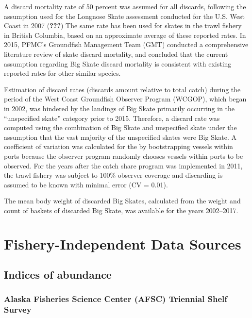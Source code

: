 \documentclass[12pt,]{article}
\begin{document}
A discard mortality rate of 50 percent was assumed for all discards,
following the assumption used for the Longnose Skate assessment
conducted for the U.S. West Coast in 2007 ({\textbf{???}}) The same rate
has been used for skates in the trawl fishery in British Columbia, based
on an approximate average of these reported rates. In 2015, PFMC's
Groundfish Management Team (GMT) conducted a comprehensive literature
review of skate discard mortality, and concluded that the current
assumption regarding Big Skate discard mortality is consistent with
existing reported rates for other similar species.

Estimation of discard rates (discards amount relative to total catch)
during the period of the West Coast Groundfish Observer Program (WCGOP),
which began in 2002, was hindered by the landings of Big Skate primarily
occurring in the ``unspecified skate'' category prior to 2015.
Therefore, a discard rate was computed using the combination of Big
Skate and unspecified skate under the assumption that the vast majority
of the unspecified skates were Big Skate. A coefficient of variation was
calculated for the by bootstrapping vessels within ports because the
observer program randomly chooses vessels within ports to be observed.
For the years after the catch share program was implemented in 2011, the
trawl fishery was subject to 100\% observer coverage and discarding is
assumed to be known with minimal error (CV = 0.01).

The mean body weight of discarded Big Skates, calculated from the weight
and count of baskets of discarded Big Skate, was available for the years
2002--2017.

\hypertarget{fishery-independent-data-sources}{%
\section{Fishery-Independent Data
Sources}\label{fishery-independent-data-sources}}

\hypertarget{indices-of-abundance}{%
\subsection{Indices of abundance}\label{indices-of-abundance}}

\hypertarget{alaska-fisheries-science-center-afsc-triennial-shelf-survey}{%
\subsubsection{Alaska Fisheries Science Center (AFSC) Triennial Shelf
Survey}\label{alaska-fisheries-science-center-afsc-triennial-shelf-survey}}
\end{document}
